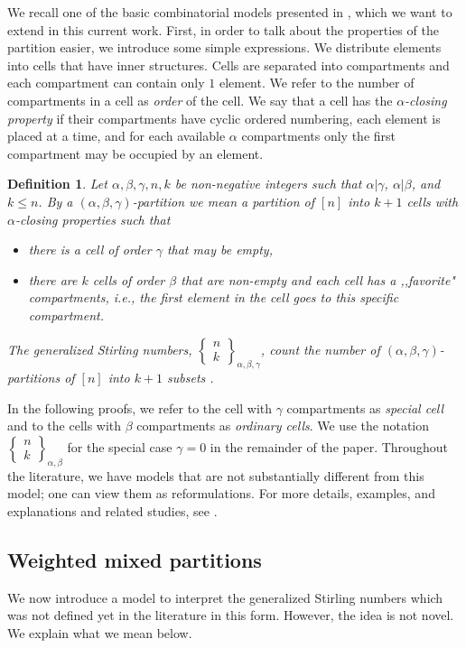 \documentclass[12pt, reqno]{amsart}
\newtheorem{proof 1}{proof 1}
\newtheorem{definition}{Definition}[section]
\def\sts#1#2{\begin{Bmatrix}
#1 \\ #2 \end{Bmatrix}}
\begin{document}
We recall one of the basic combinatorial models presented in \cite{benyi2022unfair}, which we want to extend in this current work.   
First, in order to talk about the properties of the partition easier, we introduce some simple expressions. We distribute elements into cells that have inner structures. 
Cells are separated into compartments and each compartment can contain only $1$ element. We refer to the number of compartments in a cell as \emph{order} of the cell.
We say that a cell has the \emph{$\alpha$-closing property} if their compartments have cyclic ordered numbering, each element is placed at a time, and for each available $\alpha$ compartments only the first compartment may be occupied by an element. 
\begin{definition}\cite{benyi2022unfair}\label{definition:10} Let $\alpha, \beta, \gamma, n, k$ be non-negative integers such that $\alpha|\gamma$, $\alpha|\beta$, and $k\leq n$.  
    By a $(\alpha, \beta, \gamma)$-partition we mean a partition of $[n]$ into $k+1$ cells with $\alpha$-closing properties such that 
    \begin{itemize}
    \item[1.] there is a cell of order $\gamma$ that may be empty,
    \item[2.] there are $k$ cells of order $\beta$ that are non-empty and each cell has a ,,favorite" compartments, i.e., the first element in the cell goes to this specific compartment. 
    \end{itemize}
    The generalized Stirling numbers, $\sts{n}{k}_{\alpha, \beta, \gamma}$, count the number of $(\alpha, \beta, \gamma)$-partitions of $[n]$ into $k+1$ subsets \cite{benyi2022unfair}.
\end{definition}
In the following proofs, we refer to the cell with $\gamma$ compartments as \emph{special cell} and to the cells with $\beta$ compartments as \emph{ordinary cells}.
We use the notation $\sts{n}{k}_{\alpha, \beta}$ for the special case $\gamma = 0$ in the remainder of the paper. 
 Throughout the literature, we have models that are not substantially different from this model; one can view them as reformulations. For more details, examples, and explanations and related studies, see \cite{Adell23, benyi2022unfair}. 

\subsection{Weighted mixed partitions}
We now introduce a model to interpret the generalized Stirling numbers which was not defined yet in the literature in this form. However, the idea is not novel. We explain what we mean below. 
\end{document}
